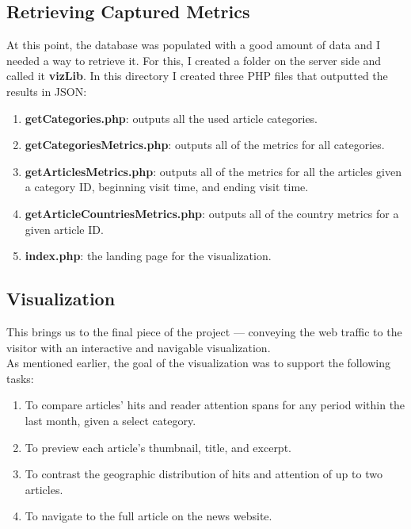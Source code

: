 \documentclass[12pt]{article}
\begin{document}
{\newpage

\subsection{Retrieving Captured Metrics}
At this point, the database was populated with a good amount of data and I needed a way to retrieve it. For this, I created a folder on the server side and called it \textbf{vizLib}. In this directory I created three PHP files that outputted the results in JSON:
\begin{enumerate}
\item{\textbf{getCategories.php}: outputs all the used article categories.}

\item{\textbf{getCategoriesMetrics.php}: outputs all of the metrics for all categories.}

\item{\textbf{getArticlesMetrics.php}: outputs all of the metrics for all the articles given a category ID, beginning visit time, and ending visit time.}

\item{\textbf{getArticleCountriesMetrics.php}: outputs all of the country metrics for a given article ID.}

\item{\textbf{index.php}: the landing page for the visualization}.

\end{enumerate}

\newpage

\subsection{Visualization}

This brings us to the final piece of the project --- conveying the web traffic to the visitor with an interactive and navigable visualization. \\ As mentioned earlier, the goal of the visualization was to support the following tasks:
\begin{enumerate}
\item To compare articles' hits and reader attention spans for any period within the last month, given a select category.
\item To preview each article's thumbnail, title, and excerpt.
\item To contrast the geographic distribution of hits and attention of up to two articles.
\item To navigate to the full article on the news website.
\end{enumerate}

}
\end{document}
